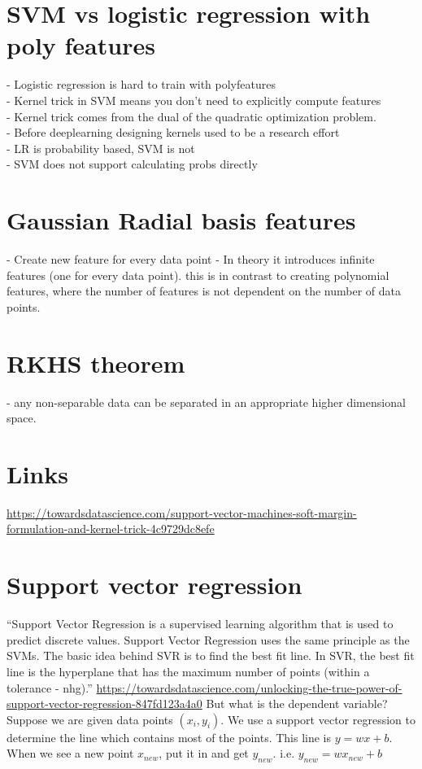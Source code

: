 \documentclass{article}
\begin{document}
\section{SVM vs logistic regression with poly features}
- Logistic regression is hard to train with polyfeatures\\
- Kernel trick in SVM means you don't need to explicitly compute features\\
- Kernel trick comes from the dual of the quadratic optimization problem.\\
- Before deeplearning designing kernels used to be a research effort\\
- LR is probability based, SVM is not\\
- SVM does not support calculating probs directly\\

\section{Gaussian Radial basis features}
- Create new feature for every data point
- In theory it introduces infinite features (one for every data point). this is in contrast to creating polynomial features, where the number of features is not dependent on the number of data points.

\section{RKHS theorem}
- any non-separable data can be separated in an appropriate higher dimensional space.

\section{Links}
\url{https://towardsdatascience.com/support-vector-machines-soft-margin-formulation-and-kernel-trick-4c9729dc8efe}

\section{Support vector regression}
``Support Vector Regression is a supervised learning algorithm that is used to predict discrete values. Support Vector Regression uses the same principle as the SVMs. The basic idea behind SVR is to find the best fit line. In SVR, the best fit line is the hyperplane that has the maximum number of points (within a tolerance - nhg).'' \url{https://towardsdatascience.com/unlocking-the-true-power-of-support-vector-regression-847fd123a4a0} But what is the dependent variable? Suppose we are given data points $(x_i,y_i)$. We use a support vector regression to determine the line which contains most of the points. This line is $y=wx+b$. When we see a new point $x_{new}$, put it in and get $y_{new}$. i.e. $y_{new} = wx_{new}+b$
\end{document}
